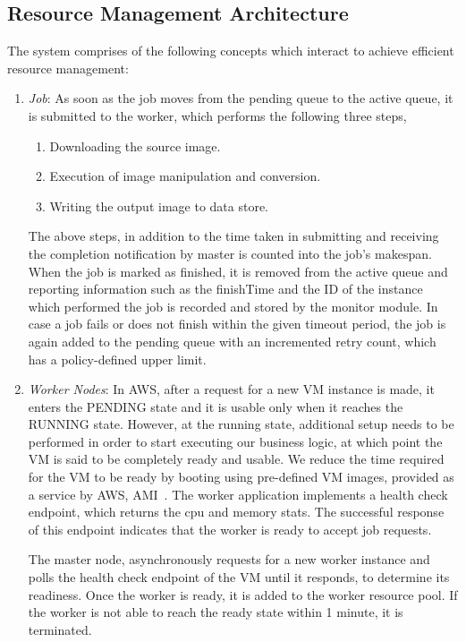 \documentclass[a4paper]{IEEEtran}
\begin{document}
\subsection{Resource Management Architecture}

The system comprises of the following concepts which interact to achieve efficient resource management:

\begin{enumerate}
  \item \emph{Job}: As soon as the job moves from the pending queue to the active queue, it is submitted to the worker, which performs the following three steps,
  \begin{enumerate}
    \item Downloading the source image.
    \item Execution of image manipulation and conversion.
    \item Writing the output image to data store.
  \end{enumerate} 
  The above steps, in addition to the time taken in submitting and receiving the completion notification by master
  is counted into the job's makespan. When the job is marked as finished, it is removed from the active queue
  and reporting information such as the finishTime and the ID of the instance which performed the job is recorded
  and stored by the monitor module. In case a job fails or does not finish within the given timeout period, the 
  job is again added to the pending queue with an incremented retry count, which has a policy-defined upper limit.

  \item \emph{Worker Nodes}: In AWS, after a request for a new VM instance is made, it enters the \textsc{PENDING}
  state and it is usable only when it reaches the \textsc{RUNNING} state. However, at the running state, additional
  setup needs to be performed in order to start executing our business logic, at which point the VM is said to be
  completely ready and usable. We reduce the time required for the VM to be ready by booting using pre-defined
  VM images, provided as a service by AWS, AMI~\cite{aws-ami}. The worker application implements a health check
  endpoint, which returns the cpu and memory stats. The successful response of this endpoint indicates that the
  worker is ready to accept job requests.

  The master node, asynchronously requests for a new worker instance and polls the health check endpoint of
  the VM until it responds, to determine its readiness. Once the worker is ready, it is added to the worker resource
  pool. If the worker is not able to reach the ready state within 1 minute, it is terminated.


\end{enumerate}
\end{document}
